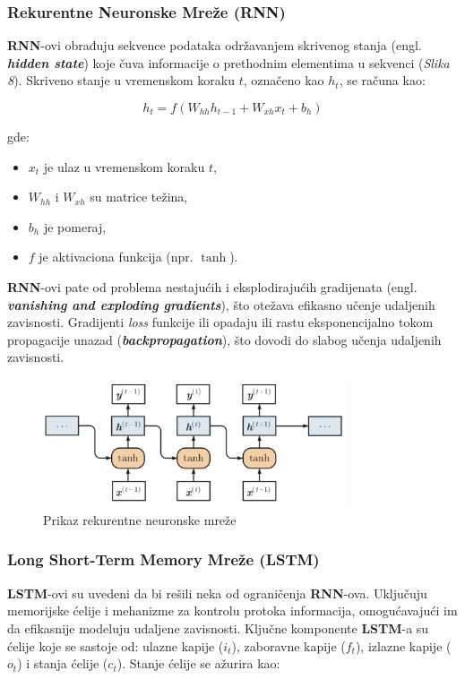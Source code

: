 \documentclass[12pt]{article}
\begin{document}
   \subsubsection{Rekurentne Neuronske Mreže (RNN)}
   \textbf{RNN}-ovi obrađuju sekvence podataka održavanjem skrivenog stanja (engl. \textbf{\textit{hidden state}}) 
   koje čuva informacije o prethodnim elementima u sekvenci (\textit{Slika 8}). 
   Skriveno stanje u vremenskom koraku \( t \), označeno kao \( h_t \), se računa kao:

   \[ h_t = f(W_{hh} h_{t-1} + W_{xh} x_t + b_h) \]

   gde:
   \begin{itemize}
      \vspace{-0.5cm}
      \setlength\itemsep{0.2em} %
      \item \( x_t \) je ulaz u vremenskom koraku \( t \),
      \item \( W_{hh} \) i \( W_{xh} \) su matrice težina,
      \item \( b_h \) je pomeraj,
      \item \( f \) je aktivaciona funkcija (npr. \(\tanh\)).
   \end{itemize}

   \textbf{RNN}-ovi pate od problema nestajućih i eksplodirajućih gradijenata (engl. \textbf{\textit{vanishing and exploding gradients}}), 
   što otežava efikasno učenje udaljenih zavisnosti. Gradijenti \textit{loss} funkcije ili opadaju ili rastu 
   eksponencijalno tokom propagacije unazad (\textbf{\textit{backpropagation}}), što dovodi 
   do slabog učenja udaljenih zavisnosti.
   
   \begin{figure}[h!]
      \centering
      \vspace{1.5cm} %
      \includegraphics[width=0.8\textwidth]{rnn.png}
      \caption{Prikaz rekurentne neuronske mreže}
      \label{fig:rnn}
   \end{figure}

   \subsubsection{Long Short-Term Memory Mreže (LSTM)}
   \textbf{LSTM}-ovi su uvedeni da bi rešili neka od ograničenja \textbf{RNN}-ova. 
   Uključuju memorijske ćelije i mehanizme za kontrolu protoka informacija, 
   omogućavajući im da efikasnije modeluju udaljene zavisnosti. Ključne komponente \textbf{LSTM}-a su ćelije 
   koje se sastoje od: ulazne kapije (\( i_t \)), zaboravne kapije (\( f_t \)), izlazne kapije (\( o_t \)) i 
   stanja ćelije (\( c_t \)). Stanje ćelije se ažurira kao:
\end{document}

